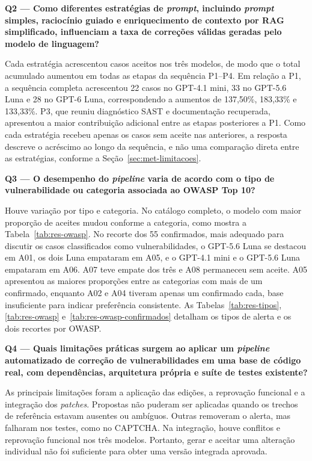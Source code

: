 \textbf{Q2 --- Como diferentes estratégias de \textit{prompt}, incluindo \textit{prompt} simples, raciocínio guiado e enriquecimento de contexto por RAG simplificado, influenciam a taxa de correções válidas geradas pelo modelo de linguagem?}

Cada estratégia acrescentou casos aceitos nos três modelos, de modo que o total acumulado aumentou em todas as etapas da sequência P1--P4. Em relação a P1, a sequência completa acrescentou 22 casos no GPT-4.1 mini, 33 no GPT-5.6 Luna e 28 no GPT-6 Luna, correspondendo a aumentos de 137,50\%, 183,33\% e 133,33\%. P3, que reuniu diagnóstico SAST e documentação recuperada, apresentou a maior contribuição adicional entre as etapas posteriores a P1. Como cada estratégia recebeu apenas os casos sem aceite nas anteriores, a resposta descreve o acréscimo ao longo da sequência, e não uma comparação direta entre as estratégias, conforme a Seção~\ref{sec:met-limitacoes}.

\textbf{Q3 --- O desempenho do \textit{pipeline} varia de acordo com o tipo de vulnerabilidade ou categoria associada ao OWASP Top 10?}

Houve variação por tipo e categoria. No catálogo completo, o modelo com maior proporção de aceites mudou conforme a categoria, como mostra a Tabela~\ref{tab:res-owasp}. No recorte dos 55 confirmados, mais adequado para discutir os casos classificados como vulnerabilidades, o GPT-5.6 Luna se destacou em A01, os dois Luna empataram em A05, e o GPT-4.1 mini e o GPT-5.6 Luna empataram em A06. A07 teve empate dos três e A08 permaneceu sem aceite. A05 apresentou as maiores proporções entre as categorias com mais de um confirmado, enquanto A02 e A04 tiveram apenas um confirmado cada, base insuficiente para indicar preferência consistente. As Tabelas~\ref{tab:res-tipos}, \ref{tab:res-owasp} e~\ref{tab:res-owasp-confirmados} detalham os tipos de alerta e os dois recortes por OWASP.

\textbf{Q4 --- Quais limitações práticas surgem ao aplicar um \textit{pipeline} automatizado de correção de vulnerabilidades em uma base de código real, com dependências, arquitetura própria e suíte de testes existente?}

As principais limitações foram a aplicação das edições, a reprovação funcional e a integração dos \textit{patches}. Propostas não puderam ser aplicadas quando os trechos de referência estavam ausentes ou ambíguos. Outras removeram o alerta, mas falharam nos testes, como no CAPTCHA. Na integração, houve conflitos e reprovação funcional nos três modelos. Portanto, gerar e aceitar uma alteração individual não foi suficiente para obter uma versão integrada aprovada.

